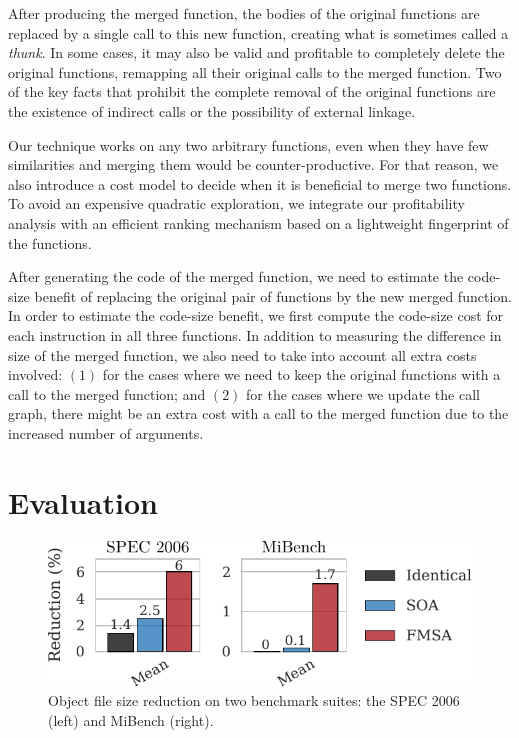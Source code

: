 \documentclass[10pt,twocolumn,nocopyrightspace]{sigplanconf}
\begin{document}
After producing the merged function, the bodies of the original functions are
replaced by a single call to this new function, creating what is sometimes
called a \textit{thunk}.
In some cases, it may also be valid and profitable to completely delete the
original functions, remapping all their original calls to the merged function.  
Two of the key facts that prohibit the complete removal of the original functions
are the existence of indirect calls or the possibility of external linkage.


Our technique works on any two arbitrary functions, even when they have few
similarities and merging them would
be counter-productive. For that reason, we also introduce a cost model to decide
when it is beneficial to merge two functions.
To avoid an expensive quadratic exploration, we integrate our profitability analysis
with an efficient ranking mechanism based on a lightweight fingerprint of the functions.

After generating the code of the merged function, we need to estimate the
code-size benefit of replacing the original pair of functions by the new merged
function.
In order to estimate the code-size benefit, we first compute the code-size cost
for each instruction in all three functions.
In addition to measuring the difference in size of the merged function, we also
need to take into account all extra costs involved:
$(1)$ for the cases where we need to keep the original functions with a call to
the merged function;
and $(2)$ for the cases where we update the call graph, there might be an extra
cost with a call to the merged function due to the increased number of arguments.
 
\section{Evaluation}

\begin{figure}[t!]
  \centering
  \includegraphics[width=0.85\linewidth]{figs/code-size.pdf}
  \caption{Object file size reduction on two benchmark suites: the SPEC 2006 (left) and MiBench (right).}
  \vspace{-2ex}
  \label{fig:code-size}
\end{figure}
\end{document}
